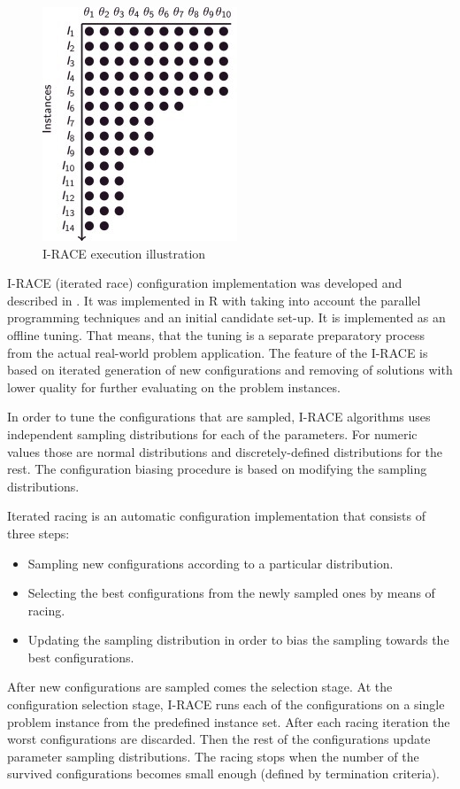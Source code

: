 \documentclass[11pt,a4paper,oneside]{book}
\begin{document}
\begin{figure}
  \centering
    \includegraphics{irace.jpg}
  \caption{I-RACE execution illustration}
  \label{fig:irace}
\end{figure}


I-RACE (iterated race) configuration implementation was developed and described in \cite{iraceaac}. It was implemented in R with taking into account the parallel programming techniques and an initial candidate set-up. It is implemented as an offline tuning. That means, that the tuning is a separate preparatory process from the actual real-world problem application. The feature of the I-RACE is based on iterated generation of new configurations and removing of solutions with lower quality for further evaluating on the problem instances.

In order to tune the configurations that are sampled, I-RACE algorithms uses independent sampling distributions for each of the parameters. For numeric values those are normal distributions and discretely-defined distributions for the rest. The configuration biasing procedure is based on modifying the sampling distributions.

Iterated racing is an automatic configuration implementation that consists of three steps:

\begin{itemize}
\item Sampling new configurations according to a particular distribution.
\item Selecting the best configurations from the newly sampled ones by means of racing.
\item Updating the sampling distribution in order to bias the sampling towards the best configurations.
\end{itemize}

After new configurations are sampled comes the selection stage. At the configuration selection stage, I-RACE runs each of the configurations on a single problem instance from the predefined instance set. After each racing iteration the worst configurations are discarded. Then the rest of the configurations update parameter sampling distributions. The racing stops when the number of the survived configurations becomes small enough (defined by termination criteria).
\end{document}
